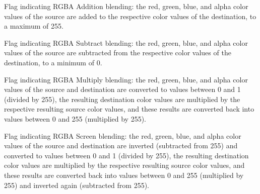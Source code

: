 \documentclass[letterpaper,10pt,english]{sphinxmanual}
\begin{document}

\begin{fulllineitems}
\label{sge:sge.sge.BLEND_RGBA_ADD}
Flag indicating RGBA Addition blending: the red, green, blue, and
alpha color values of the source are added to the respective color
values of the destination, to a maximum of 255.

\end{fulllineitems}


\begin{fulllineitems}
\label{sge:sge.sge.BLEND_RGBA_SUBTRACT}
Flag indicating RGBA Subtract blending: the red, green, blue, and
alpha color values of the source are subtracted from the respective
color values of the destination, to a minimum of 0.

\end{fulllineitems}


\begin{fulllineitems}
\label{sge:sge.sge.BLEND_RGBA_MULTIPLY}
Flag indicating RGBA Multiply blending: the red, green, blue,
and alpha color values of the source and destination are converted to
values between 0 and 1 (divided by 255), the resulting destination
color values are multiplied by the respective resulting source color
values, and these results are converted back into values between 0
and 255 (multiplied by 255).

\end{fulllineitems}


\begin{fulllineitems}
\label{sge:sge.sge.BLEND_RGBA_SCREEN}
Flag indicating RGBA Screen blending: the red, green, blue, and alpha
color values of the source and destination are inverted (subtracted
from 255) and converted to values between 0 and 1 (divided by 255),
the resulting destination color values are multiplied by the
respective resulting source color values, and these results are
converted back into values between 0 and 255 (multiplied by 255) and
inverted again (subtracted from 255).

\end{fulllineitems}
\end{document}

